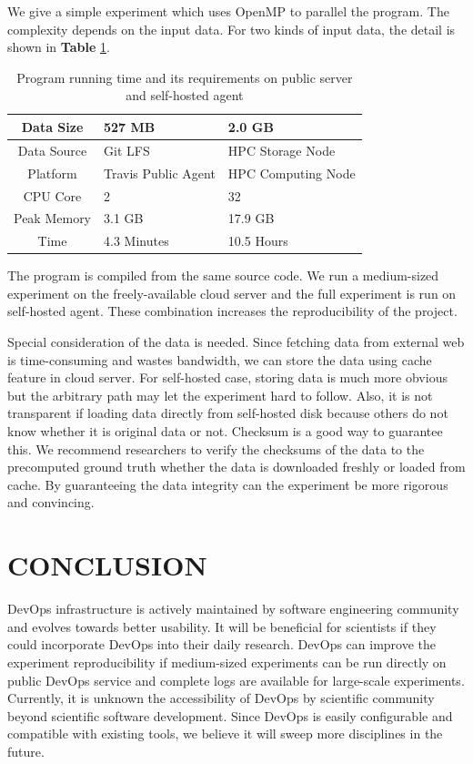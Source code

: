 \documentclass{IEEEcsmag}
\begin{document}
We give a simple experiment which uses OpenMP to parallel the program. The complexity depends on the input data. For two kinds of input data, the detail is shown in {\bf Table} \ref{tab:time}.
\begin{table}
\centering
\begin{tabular}{|c|p{1.5cm}|p{1.5cm}|}
\hline
Data Size & 527 MB & 2.0 GB\\
\hline
Data Source & Git LFS & HPC Storage Node \\
\hline
Platform & Travis Public Agent & HPC Computing Node \\
\hline
CPU Core & 2 & 32  \\ 
\hline
Peak Memory  & 3.1 GB  & 17.9 GB\\ 
\hline
Time & 4.3 Minutes & 10.5 Hours \\
\hline
\end{tabular}
\caption{Program running time and its requirements on public server and self-hosted agent}\label{tab:time}
\end{table}

The program is compiled from the same source code. We run a medium-sized experiment on the freely-available cloud server and the full experiment is run on self-hosted agent. These combination increases the reproducibility of the project.

Special consideration of the data is needed. Since fetching data from external web is time-consuming and wastes bandwidth, we can store the data using cache feature in cloud server. For self-hosted case, storing data is much more obvious but the arbitrary path may let the experiment hard to follow. Also, it is not transparent if loading data directly from self-hosted disk because others do not know whether it is original data or not. Checksum is a good way to guarantee this. We recommend researchers to verify the checksums of the data to the precomputed ground truth whether the data is downloaded freshly or loaded from cache. By guaranteeing the data integrity can the experiment be more rigorous and convincing.



\section{CONCLUSION}
DevOps infrastructure is actively maintained by software engineering community and evolves towards better usability. It will be beneficial for scientists if they could incorporate DevOps into their daily research. DevOps can improve the experiment reproducibility if medium-sized experiments can be run directly on public DevOps service and complete logs are available for large-scale experiments. Currently, it is unknown the accessibility of DevOps by scientific community beyond scientific software development. Since DevOps is easily configurable and compatible with existing tools, we believe it will sweep more disciplines in the future.
\end{document}
